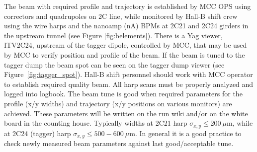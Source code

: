 The beam with required profile and trajectory is established by MCC OPS using correctors and quadrupoles on 2C line, while monitored by Hall-B shift crew using the wire harps and the nanoamp (nA) BPMs \cite{nA_BPM} at 2C21 and 2C24 girders in the upstream tunnel (see  Figure \ref{fig:belements}). There is a Yag viewer, ITV2C24, upstream of the tagger dipole, controlled by MCC, that may be used by MCC to verify position and profile of the beam. If the beam is tuned to the tagger dump the beam spot can be seen on the tagger dump viewer (see Figure~\ref{fig:tagger_spot}). 
Hall-B shift personnel should work with MCC operator to establish required quality beam. All harp scans must be properly analyzed and logged into logbook. The beam tune is good when required parameters for the profile (x/y widths) and trajectory (x/y positions on various monitors) are achieved. These parameters will be written on the run wiki and/or on the white board in the counting house. Typically widths at 2C21 harp $\sigma_{x,y}\le 200~\mu$m, while at 2C24 (tagger) harp $\sigma_{x,y}\le 500-600~\mu$m. In general it is a good practice to check newly measured beam parameters against last good/acceptable tune.  

